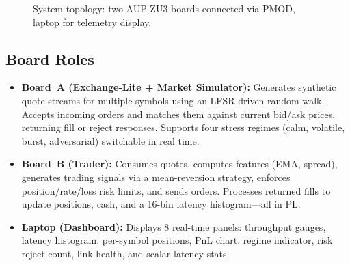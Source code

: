\documentclass[conference]{IEEEtran}
\begin{document}
\begin{figure}[h]
\centering
{}
\caption{System topology: two AUP-ZU3 boards connected via PMOD, laptop for telemetry display.}
\label{fig:system_overview}
\end{figure}

\subsection{Board Roles}

\begin{itemize}[noitemsep]
  \item \textbf{Board~A (Exchange-Lite + Market Simulator):} Generates synthetic quote streams for multiple symbols using an LFSR-driven random walk. Accepts incoming orders and matches them against current bid/ask prices, returning fill or reject responses. Supports four stress regimes (calm, volatile, burst, adversarial) switchable in real time.
  \item \textbf{Board~B (Trader):} Consumes quotes, computes features (EMA, spread), generates trading signals via a mean-reversion strategy, enforces position/rate/loss risk limits, and sends orders. Processes returned fills to update positions, cash, and a 16-bin latency histogram---all in PL.
  \item \textbf{Laptop (Dashboard):} Displays 8 real-time panels: throughput gauges, latency histogram, per-symbol positions, PnL chart, regime indicator, risk reject count, link health, and scalar latency stats.
\end{itemize}
\end{document}
